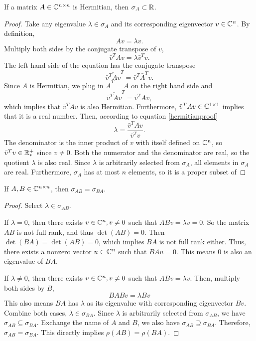 \begin{theorem}
If a matrix \(A\in\mathbb{C}^{n\times n}\) is Hermitian, then \(\sigma_A\subset\mathbb{R}\).
\end{theorem}
\begin{proof}
Take any eigenvalue \(\lambda\in\sigma_A\) and its corresponding eigenvector \(v\in\mathbb{C}^n\).
By definition,
\begin{equation}
Av=\lambda v.
\end{equation}
Multiply both sides by the conjugate transpose of $v$,
\begin{equation}\label{hermitianproof}
\bar{v}^T Av=\lambda \bar{v}^T v.
\end{equation}
The left hand side of the equation has the conjugate transpose
\begin{equation}
\overline{\bar{v}^T Av}^T=\bar{v}^T\bar{A}^T v.
\end{equation}
Since $A$ is Hermitian, we plug in \(\bar{A}^T=A\) on the right hand side and
\begin{equation}
\overline{\bar{v}^T Av}^T=\bar{v}^TA v,
\end{equation}
which implies that \(\bar{v}^T Av\) is also Hermitian.
Furthermore, \(\bar{v}^T Av\in\mathbb{C}^{1\times1}\) implies that it is a real number.
Then, according to equation \ref{hermitianproof}
\begin{equation}
\lambda=\frac{\bar{v}^T Av}{\bar{v}^T v}.
\end{equation}
The denominator is the inner product of $v$ with itself defined on \(\mathbb{C}^n\), so \(\bar{v}^T v\in\mathbb{R}_*^+\) since \(v\neq0\).
Both the numerator and the denominator are real, so the quotient $\lambda$ is also real.
Since $\lambda$ is arbitrarily selected from \(\sigma_A\), all elements in \(\sigma_A\) are real.
Furthermore, \(\sigma_A\) has at most $n$ elements, so it is a proper subset of 
\end{proof}

\begin{theorem}
If \(A,B\in\mathbb{C}^{n\times n}\), then \(\sigma_{AB}=\sigma_{BA}\).
\end{theorem}
\begin{proof}
Select \(\lambda\in\sigma_{AB}\).
\item If \(\lambda=0\), then there exists \(v\in\mathbb{C}^n,v\neq0\) such that \(ABv=\lambda v=0\).
So the matrix $AB$ is not full rank, and thus \(\det(AB)=0\).
Then \(\det(BA)=\det(AB)=0\), which implies $BA$ is not full rank either.
Thus, there exists a nonzero vector \(u\in\mathbb{C}^n\) such that \(BAu=0\).
This means 0 is also an eigenvalue of $BA$.
\item If \(\lambda\neq0\), then there exists \(v\in\mathbb{C}^n,v\neq0\) such that \(ABv=\lambda v\).
Then, multiply both sides by $B$,
\begin{equation}
BABv=\lambda Bv
\end{equation}
This also means \(BA\) has $\lambda$ as its eigenvalue with corresponding eigenvector \(Bv\).
Combine both cases, \(\lambda\in\sigma_{BA}\).
Since $\lambda$ is arbitrarily selected from \(\sigma_{AB}\), we have \(\sigma_{AB}\subseteq\sigma_{BA}\).
Exchange the name of $A$ and $B$, we also have \(\sigma_{AB}\supseteq\sigma_{BA}\).
Therefore, \(\sigma_{AB}=\sigma_{BA}\).
This directly implies \(\rho(AB)=\rho(BA)\).
\end{proof}
